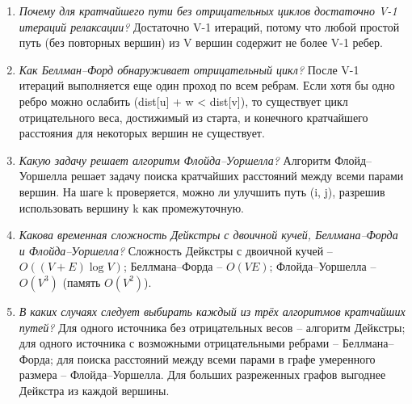 \begin{enumerate}
	Беллман–Форд выполняет V-1 полных проходов по всем ребрам, на каждом проходе ослабляя все ребра. 
	Если на очередном проходе не было ни одной релаксации, алгоритм завершается досрочно.
	\item \textit{Почему для кратчайшего пути без отрицательных циклов достаточно V-1 итераций релаксации?}\newline
	Достаточно V-1 итераций, потому что любой простой путь (без повторных вершин) из V вершин содержит не более V-1 ребер. 
	\item \textit{Как Беллман–Форд обнаруживает отрицательный цикл?}\newline
	После V-1 итераций выполняется еще один проход по всем ребрам. 
	Если хотя бы одно ребро можно ослабить (dist[u] + w < dist[v]), то существует цикл отрицательного веса, достижимый из старта, и конечного кратчайшего расстояния для некоторых вершин не существует.
	\item \textit{Какую задачу решает алгоритм Флойда–Уоршелла?}\newline
	Алгоритм Флойд–Уоршелла решает задачу поиска кратчайших расстояний между всеми парами вершин. 
	На шаге k проверяется, можно ли улучшить путь (i, j), разрешив использовать вершину k как промежуточную.
	\item \textit{Какова временная сложность Дейкстры с двоичной кучей, Беллмана–Форда и Флойда–Уоршелла?}\newline
	Сложность Дейкстры с двоичной кучей -- $O((V+E)\log V)$; 
	Беллмана–Форда -- $O(VE)$; 
	Флойда–Уоршелла -- $O(V^3)$ (память $O(V^2)$).
	\item \textit{В каких случаях следует выбирать каждый из трёх алгоритмов кратчайших путей?}\newline
	Для одного источника без отрицательных весов -- алгоритм Дейкстры; 
	для одного источника с возможными отрицательными ребрами -- Беллмана–Форда; 
	для поиска расстояний между всеми парами в графе умеренного размера -- Флойда–Уоршелла.
	Для больших разреженных графов выгоднее Дейкстра из каждой вершины.
\end{enumerate}